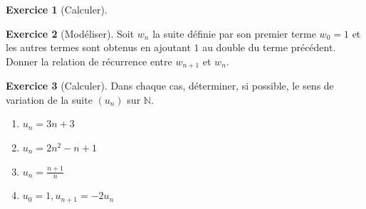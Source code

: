 \documentclass{exam}
\theoremstyle{definition}
\newtheorem{exercice}{Exercice}
\begin{document}
\begin{exercice}[Calculer]
\end{exercice}

\begin{exercice}[Modéliser]
    Soit $w_n$ la suite définie par son premier terme $w_0 = 1$ et les autres termes sont obtenus en ajoutant $1$ au double du terme précédent. Donner la relation de récurrence entre $w_{n+1}$ et $w_n$.
\end{exercice}
\begin{center}
\end{center}

\begin{exercice}[Calculer]
    Dans chaque cas, déterminer, si possible, le sens de variation de la suite $(u_n)$ sur $\mathbb{N}$.

    \begin{enumerate}
        \item $u_n = 3n + 3$
        \item $u_n = 2n^2 - n + 1$
        \item $u_n = \frac{n+1}{n}$
        \item $u_0 = 1, u_{n+1} = -2u_n$
    \end{enumerate}
    
\end{exercice}
\end{document}
